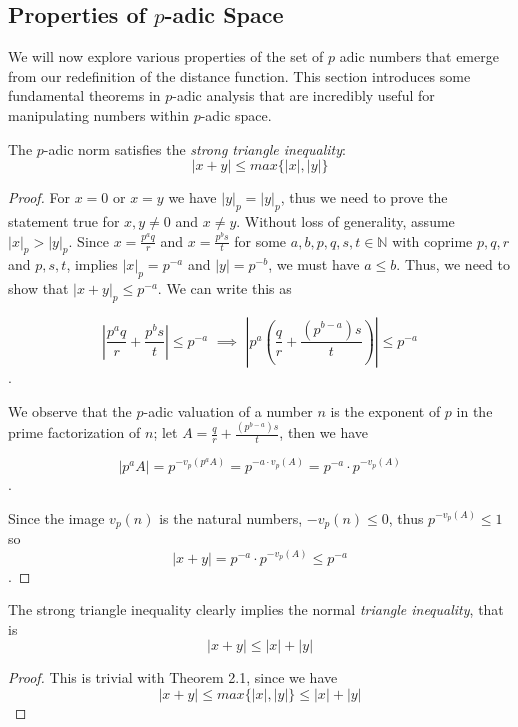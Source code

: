 \documentclass[a4paper]{article}
\begin{document}
\subsection{Properties of $p$-adic Space}
We will now explore various properties of the set of $p$ adic numbers that emerge from our redefinition of the distance function. This section introduces some fundamental theorems in $p$-adic analysis that are incredibly useful for manipulating numbers within $p$-adic space.

\begin{theorem}

The $p$-adic norm satisfies the \textit{strong triangle inequality}:
\[|x+y| \leq max{\{|x|, |y|\}}\]

\end{theorem}

\begin{proof}
    For $x=0$ or $x=y$ we have $|y|_p = |y|_p$, thus we need to prove the statement true for $x, y \neq 0$ and $x \neq y$. Without loss of generality, assume $|x|_p>|y|_p$. Since $x=\frac{p^{a}q}{r}$ and $x=\frac{p^{b}s}{t}$ for some $a, b, p, q, s, t \in \mathbb{N}$ with coprime $p, q, r$ and $p, s, t$, implies $|x|_p=p^{-a}$  and $|y|=p^{-b}$, we must have $a\leq b$. Thus, we need to show that $|x+y|_p \leq p^{-a}$. We can write this as
    
    \[|\frac{p^{a}q}{r}+\frac{p^{b}s}{t}| \leq p^{-a} \,\,\implies\,\, |p^{a}(\frac{q}{r}+\frac{(p^{b-a})s}{t})| \leq p^{-a}\].
    
    We observe that the $p$-adic valuation of a number $n$ is the exponent of $p$ in the prime factorization of $n$; let $A=\frac{q}{r}+\frac{(p^{b-a})s}{t}$, then we have
    
    \[|p^{a}A| = p^{-v_{p}(p^{a}A)} = p^{-a \cdot v_{p}(A)} = p^{-a}\cdot p^{-v_{p}(A)}\].
    
    Since the image $v_{p}(n)$ is the natural numbers, $-v_{p}(n) \leq 0$, thus $p^{-v_{p}(A)} \leq 1$ so 
   \[ |x+y| = p^{-a}\cdot p^{-v_{p}(A)} \leq p^{-a}\].
\end{proof}



\begin{corollary}

The strong triangle inequality clearly implies the normal \textit{triangle inequality}, that is
\[|x+y| \leq |x|+|y|\]

\end{corollary}

\begin{proof}
    This is trivial with Theorem 2.1, since we have
    \[|x+y| \leq max{\{|x|, |y|\}} \leq |x|+|y|\]
\end{proof}
\end{document}
